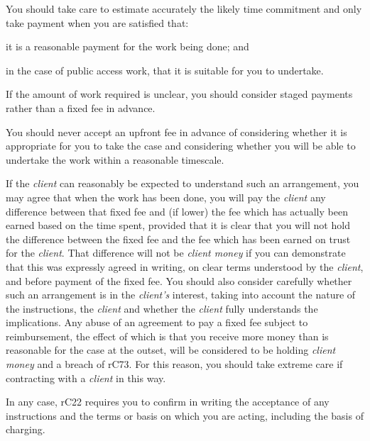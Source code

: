 \begin{dotlist}
 \item You should take care to estimate accurately the likely time commitment
and only take payment when you are satisfied that:
\begin{dashlist}
\item it is a reasonable payment for the work being done; and

\item in the case of public access work, that it is suitable for you to
undertake.
\end{dashlist}
\item If the amount of work required is unclear, you should consider staged
payments rather than a fixed fee in advance.

\item You should never accept an upfront fee in advance of considering
whether it is appropriate for you to take the case and considering
whether you will be able to undertake the work within a reasonable
timescale.

\item If the \emph{client} can reasonably be expected to understand such an
arrangement, you may agree that when the work has been done, you will
pay the \emph{client} any difference between that fixed fee and (if
lower) the fee which has actually been earned based on the time spent,
provided that it is clear that you will not hold the difference between
the fixed fee and the fee which has been earned on trust for the
\emph{client}. That difference will not be \emph{client money} if you
can demonstrate that this was expressly agreed in writing, on clear
terms understood by the \emph{client}, and before payment of the fixed
fee. You should also consider carefully whether such an arrangement is
in the \emph{client's} interest, taking into account the nature of the
instructions, the \emph{client} and whether the \emph{client} fully
understands the implications. Any abuse of an agreement to pay a fixed
fee subject to reimbursement, the effect of which is that you receive
more money than is reasonable for the case at the outset, will be
considered to be holding \emph{client money} and a breach of rC73. For
this reason, you should take extreme care if contracting with a
\emph{client} in this way.

\item In any case, rC22 requires you to confirm in writing the acceptance of
any instructions and the terms or basis on which you are acting,
including the basis of charging.
    
\end{dotlist}

